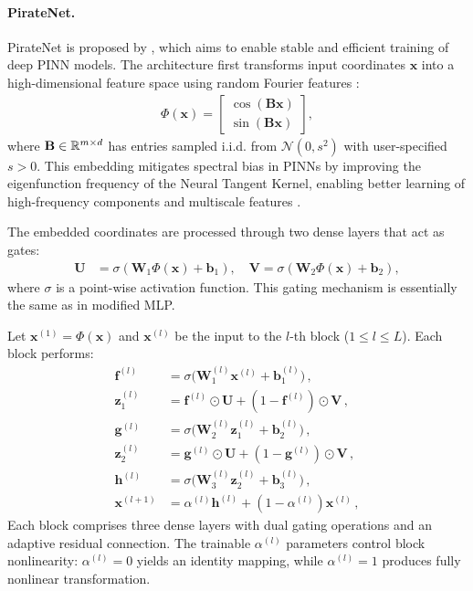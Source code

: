 \paragraph{PirateNet.}  PirateNet is proposed by   \cite{wang2024piratenets}, which aims to enable stable and efficient training of deep PINN models.  The architecture first transforms input coordinates $\mathbf{x}$ into a high-dimensional feature space using random Fourier features \cite{tancik2020fourier}:
\begin{align*}
    \Phi(\mathbf{x})= \begin{bmatrix}
    \cos (\mathbf{B x} ) \\
    \sin (\mathbf{B x} )
    \end{bmatrix},
\end{align*}
where $\mathbf{B} \in \mathbb{R}^{m \times d}$ has entries sampled i.i.d. from $\mathcal{N}(0, s^2)$ with user-specified $s > 0$.  This embedding mitigates spectral bias in PINNs by improving the eigenfunction frequency of the Neural Tangent Kernel, enabling better learning of high-frequency components and multiscale features \cite{wang2021eigenvector}.

The embedded coordinates are processed through two dense layers that act as gates:
\begin{align*}
\mathbf{U} &= \sigma(\mathbf{W}_1 \Phi(\mathbf{x}) + \mathbf{b}_1  ), \quad
\mathbf{V} = \sigma(\mathbf{W}_2 \Phi(\mathbf{x}) + \mathbf{b}_2  ),
\end{align*}
where $\sigma$ is a point-wise activation function. This gating mechanism is essentially the same as in modified MLP.

Let $\mathbf{x}^{(1)} = \Phi(\mathbf{x})$ and $\mathbf{x}^{(l)}$ be the input to the $l$-th block ($1 \le l \le L$). Each block performs:
\begin{align}
    \mathbf{f}^{(l)}  &= \sigma\big(\mathbf{W}^{(l)}_1 \mathbf{x}^{(l)} + \mathbf{b}^{(l)}_1\big)\,, \label{eq: step1}  \\
    \mathbf{z}^{(l)}_1 &= \mathbf{f}^{(l)} \odot \mathbf{U} + (1 - \mathbf{f}^{(l)}) \odot \mathbf{V}\,,  \label{eq: gate1} \\
     \mathbf{g}^{(l)}  &= \sigma\big(\mathbf{W}^{(l)}_2 \mathbf{z}_1^{(l)} + \mathbf{b}^{(l)}_2\big)\,, \\
     \mathbf{z}^{(l)}_2 &= \mathbf{g}^{(l)} \odot \mathbf{U} + (1 - \mathbf{g}^{(l)}) \odot \mathbf{V}\,,  \label{eq: gate2} \\
      \mathbf{h}^{(l)}  &= \sigma\big(\mathbf{W}^{(l)}_3 \mathbf{z}_2^{(l)} + \mathbf{b}^{(l)}_3\big)\,, \\
    \mathbf{x}^{(l+1)} &= \alpha^{(l)}  \mathbf{h}^{(l)} + (1 - \alpha^{(l)})   \mathbf{x}^{(l)}\,,
    \label{eq: skip}
\end{align}
Each block comprises three dense layers with dual gating operations and an adaptive residual connection. The trainable $\alpha^{(l)}$ parameters control block nonlinearity: $\alpha^{(l)}=0$ yields an identity mapping, while $\alpha^{(l)}=1$ produces fully nonlinear transformation. 

